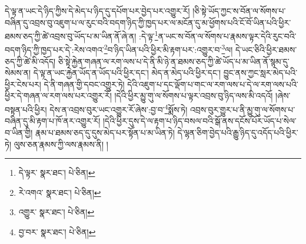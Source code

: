 དེ་ལྟ་ན་ཡང་དེ་ཉིད་ཀྱིས་དེ་མེད་པ་ཉིད་དུ་དཔོག་པར་བྱེད་པར་འགྱུར་རོ། །ཅི་སྟེ་ཡོད་ཀྱང་ས་བོན་ལ་སོགས་པ་བཞིན་དུ་འབྲས་བུ་འཇུག་པ་ལ་རུང་བའི་བདག་ཉིད་ཀྱི་ཁྱད་པར་ལ་མངོན་དུ་མ་ཕྱོགས་པའི་ངོ་བོ་ཡིན་པའི་ཕྱིར་ཐམས་ཅད་ཀྱི་ཚེ་འབྲས་བུ་ཡོད་པ་མ་ཡིན་ནོ་ཞེ་ན། :དེ་ལྟ་\footnote{དེ་ལྟར་  སྣར་ཐང་།  པེ་ཅིན། }ན་ཡང་ས་བོན་ལ་སོགས་པ་རྣམས་ལྟར་དེའི་རུང་བའི་བདག་ཉིད་ཀྱི་ཁྱད་པར་དེ་:རེས་འགའ་\footnote{རེ་འགའ་  སྣར་ཐང་།  པེ་ཅིན། }བ་ཉིད་ཡིན་པའི་ཕྱིར་མི་རྟག་པར་:འགྱུར་བ་\footnote{འགྱུར་  སྣར་ཐང་།  པེ་ཅིན། }ལ། དེ་ཡང་ཅིའི་ཕྱིར་ཐམས་ཅད་ཀྱི་ཚེ་མི་འདོད། ཅི་སྟེ་རྐྱེན་གཞན་ལ་རག་ལས་པ་དེ་ནི་མི་ཉེ་ན་ཐམས་ཅད་ཀྱི་ཚེ་ཡོད་པ་མ་ཡིན་ནོ་སྙམ་དུ་སེམས་ན། དེ་ལྟ་ན་ཡང་རྐྱེན་ཡོད་ན་ཡོད་པའི་ཕྱིར་དང་། མེད་ན་མེད་པའི་ཕྱིར་དང་། བྱུང་ནས་ཀྱང་སླར་མེད་པའི་ཕྱིར་ངེས་པར། དེ་ནི་གཞན་གྱི་དབང་འགྱུར་ཏེ། དེའི་འཇུག་པ་དང་ལྡོག་པ་གང་ལ་རག་ལས་པ་དེ་ལ་རག་ལས་པའི་ཕྱིར་དེ་གཞན་ལ་རག་ལས་པར་འགྱུར་རོ། །དེའི་ཕྱིར་མྱུ་གུ་ལ་སོགས་པ་ལྟར་འབྲས་བུ་ཉིད་ལས་མི་འདའོ། །ཞེས་བསྟན་པའི་ཕྱིར། དེས་ན་འབྲས་བུར་ཡང་འགྱུར་རོ་ཞེས་:བྱ་བ་\footnote{བྱ་བར་  སྣར་ཐང་།  པེ་ཅིན། }སྨོས་ཏེ། འབྲས་བུར་གྱུར་པ་ནི་མྱུ་གུ་ལ་སོགས་པ་བཞིན་དུ་མི་རྟག་པ་ཁོ་ནར་འགྱུར་རོ། །དེའི་ཕྱིར་དུས་དེ་ལ་རྟག་པ་ཉིད་བསལ་བའི་སྒོ་ནས་དངོས་པོར་ཡོད་པ་སེལ་བ་ཡིན་གྱི། རྣམ་པ་ཐམས་ཅད་དུ་དུས་མེད་པར་སྟོན་པ་མ་ཡིན་ཏེ། དེ་ལྷན་ཅིག་བྱེད་པའི་རྒྱུ་ཉིད་དུ་འདོད་པའི་ཕྱིར་ཏེ། ལུས་ཅན་རྣམས་ཀྱི་ལས་རྣམས་ནི། །
